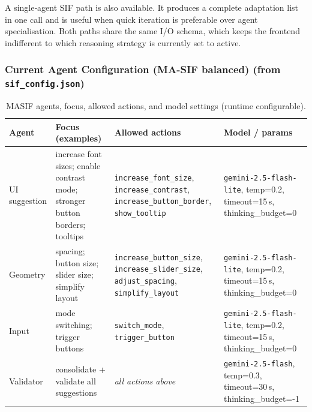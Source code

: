 \documentclass[openany]{book}
\begin{document}
A single‑agent SIF path is also available. It produces a complete adaptation list in one call and is useful when quick iteration is preferable over agent specialisation. Both paths share the same I/O schema, which keeps the frontend indifferent to which reasoning strategy is currently set to active.

\subsubsection*{Current Agent Configuration (MA-SIF balanced) (from \texttt{sif\_config.json})}
\begin{table}[H]
\centering
\begin{tabular}{p{2.1cm}p{4cm}p{4cm}p{4cm}}
\toprule
\textbf{Agent} & \textbf{Focus (examples)} & \textbf{Allowed actions} & \textbf{Model / params} \\
\midrule
UI suggestion & increase font sizes; enable contrast mode; stronger button borders; tooltips & \texttt{increase\_font\_size}, \texttt{increase\_contrast}, \texttt{increase\_button\_border}, \texttt{show\_tooltip} & \texttt{gemini-2.5-flash-lite}, temp{=}0.2, timeout{=}15\,s, thinking\_budget=0 \\
Geometry & spacing; button size; slider size; simplify layout & \texttt{increase\_button\_size}, \texttt{increase\_slider\_size}, \texttt{adjust\_spacing}, \texttt{simplify\_layout} & \texttt{gemini-2.5-flash-lite}, temp{=}0.2, timeout{=}15\,s, thinking\_budget=0 \\
Input & mode switching; trigger buttons & \texttt{switch\_mode}, \texttt{trigger\_button} & \texttt{gemini-2.5-flash-lite}, temp{=}0.2, timeout{=}15\,s, thinking\_budget=0 \\
Validator & consolidate + validate all suggestions & \emph{all actions above} & \texttt{gemini-2.5-flash}, temp{=}0.3, timeout{=}30\,s, thinking\_budget=-1 \\
\bottomrule
\end{tabular}
\caption{MA\textendash SIF agents, focus, allowed actions, and model settings (runtime configurable).}
\label{fig:current-agent-configuration}
\end{table}
\end{document}
